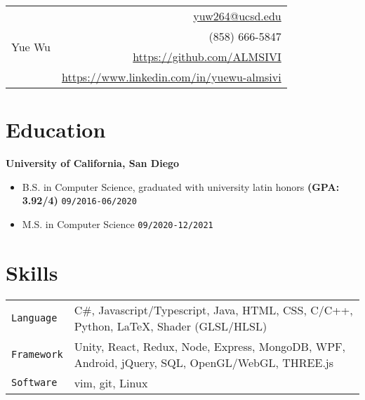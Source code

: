 \documentclass[10pt, letterpaper]{article}
\begin{document}
	\begin{tabularx}{\linewidth}{X r}
		\multirow{5}{*}{{\fontsize{50}{60}\selectfont Yue Wu}}
		& \href{mailto:yuw264@ucsd.edu}{yuw264@ucsd.edu} \\
		& (858) 666-5847 \\
		& \href{https://github.com/ALMSIVI}{https://github.com/ALMSIVI} \\
		& \href{https://www.linkedin.com/in/yuewu-almsivi}{https://www.linkedin.com/in/yuewu-almsivi}
	\end{tabularx}
	\section{Education}
	\smallskip
	\textbf{\large University of California, San Diego}
	\begin{itemize}
		\item B.S. in Computer Science, graduated with university latin honors \textbf{(GPA: 3.92/4)} \hfill \texttt{09/2016-06/2020}
		\item M.S. in Computer Science \hfill \texttt{09/2020-12/2021}
	\end{itemize}
	\section{Skills}
	\smallskip
	\begin{tabularx}{\linewidth}{l X}
		\texttt{Language} & C\#, Javascript/Typescript, Java, HTML, CSS, C/C++, Python, \LaTeX, Shader (GLSL/HLSL) \\
		\texttt{Framework} & Unity, React, Redux, Node, Express, MongoDB, WPF, Android, jQuery, SQL, OpenGL/WebGL, THREE.js \\
		\texttt{Software} & vim, git, Linux
	\end{tabularx}
\end{document}
